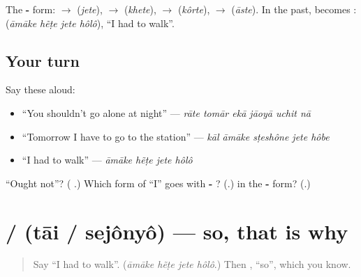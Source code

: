 The \textbf{-} form: \textbf{} $\to$ \textbf{} (\emph{jete}), \textbf{} $\to$ \textbf{} (\emph{khete}), \textbf{} $\to$ \textbf{} (\emph{kôrte}), \textbf{} $\to$ \textbf{} (\emph{āste}). In the past, \textbf{} becomes \textbf{}: \textbf{   } (\emph{āmāke hẽṭe jete hôlô}), \textquotedblleft{}I had to walk\textquotedblright{}.

\subsection*{Your turn}
Say these aloud:

\begin{itemize}
\raggedright
  \item \textquotedblleft{}You shouldn't go alone at night\textquotedblright{} — \emph{rāte tomār ekā jāoyā uchit nā}
  \item \textquotedblleft{}Tomorrow I have to go to the station\textquotedblright{} — \emph{kāl āmāke sṭeshône jete hôbe}
  \item \textquotedblleft{}I had to walk\textquotedblright{} — \emph{āmāke hẽṭe jete hôlô}
\end{itemize}

\begin{tcolorbox}[breakable,colback=teal!4,colframe=teal!35!black,title={Before you move on}]
\textquotedblleft{}Ought not\textquotedblright{}? (\textbf{ }.) Which form of \textquotedblleft{}I\textquotedblright{} goes with \textbf{- }? (\textbf{}.) \textbf{} in the \textbf{-} form? (\textbf{}.)
\end{tcolorbox}
\section[\texorpdfstring{\bn{তাই} / \bn{সেজন্য} (tāi / sejônyô)}{তাই / সেজন্য (tāi / sejônyô)}]{ /  (tāi / sejônyô) — so, that is why}

\label{lesson:BN-C269-tai-sejonno}



\begin{quote}
Say \textquotedblleft{}I had to walk\textquotedblright{}. (\emph{āmāke hẽṭe jete hôlô}.) Then \textbf{}, \textquotedblleft{}so\textquotedblright{}, which you know.
\end{quote}

